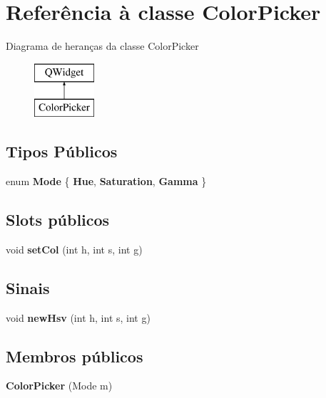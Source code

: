 \hypertarget{class_color_picker}{\section{Referência à classe Color\-Picker}
\label{class_color_picker}
}
Diagrama de heranças da classe Color\-Picker\begin{figure}[H]
\begin{center}
\leavevmode
\includegraphics[height=2.000000cm]{class_color_picker}
\end{center}
\end{figure}
\subsection*{Tipos Públicos}
\begin{DoxyCompactItemize}
\item 
enum {\bfseries Mode} \{ {\bfseries Hue}, 
{\bfseries Saturation}, 
{\bfseries Gamma}
 \}
\end{DoxyCompactItemize}
\subsection*{Slots públicos}
\begin{DoxyCompactItemize}
\item 
\hypertarget{class_color_picker_a4008365835db275bd0ca457611262111}{void {\bfseries set\-Col} (int h, int s, int g)}\label{class_color_picker_a4008365835db275bd0ca457611262111}

\end{DoxyCompactItemize}
\subsection*{Sinais}
\begin{DoxyCompactItemize}
\item 
\hypertarget{class_color_picker_abd7b1508475f64dd8e1222077095c6f2}{void {\bfseries new\-Hsv} (int h, int s, int g)}\label{class_color_picker_abd7b1508475f64dd8e1222077095c6f2}

\end{DoxyCompactItemize}
\subsection*{Membros públicos}
\begin{DoxyCompactItemize}
\item 
\hypertarget{class_color_picker_aa300279e8d9fb50251e8bb41691d07c0}{{\bfseries Color\-Picker} (Mode m)}\label{class_color_picker_aa300279e8d9fb50251e8bb41691d07c0}

\end{DoxyCompactItemize}
